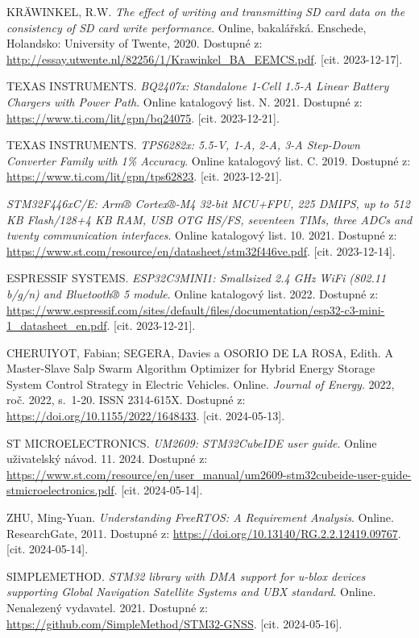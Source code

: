 \begin{thebibliography}{99}
KRÄWINKEL, R.W. \textit{The effect of writing and transmitting SD card data on the consistency of SD card write performance}. Online, bakalářská. Enschede, Holandsko: University of Twente, 2020. Dostupné z: \url{http://essay.utwente.nl/82256/1/Krawinkel\_BA\_EEMCS.pdf}. [cit. 2023-12-17].

TEXAS INSTRUMENTS. \textit{BQ2407x: Standalone 1-Cell 1.5-A Linear Battery Chargers with Power Path}. Online katalogový list. N. 2021. Dostupné z: \url{https://www.ti.com/lit/gpn/bq24075}. [cit. 2023-12-21].

TEXAS INSTRUMENTS. \textit{TPS6282x: 5.5-V, 1-A, 2-A, 3-A Step-Down Converter Family with 1\% Accuracy}. Online katalogový list. C. 2019. Dostupné z: \url{https://www.ti.com/lit/gpn/tps62823}. [cit. 2023-12-21].

\textit{STM32F446xC/E: Arm® Cortex®-M4 32-bit MCU+FPU, 225 DMIPS, up to 512 KB Flash/128+4 KB RAM, USB OTG HS/FS, seventeen TIMs, three ADCs and twenty communication interfaces}. Online katalogový list. 10. 2021. Dostupné z: \url{https://www.st.com/resource/en/datasheet/stm32f446ve.pdf}. [cit. 2023-12-14].

ESPRESSIF SYSTEMS. \textit{ESP32C3MINI1: Smallsized 2.4 GHz WiFi (802.11 b/g/n) and Bluetooth® 5 module}. Online katalogový list. 2022. Dostupné z: \url{https://www.espressif.com/sites/default/files/documentation/esp32-c3-mini-1\_datasheet\_en.pdf}. [cit. 2023-12-21].

CHERUIYOT, Fabian; SEGERA, Davies a OSORIO DE LA ROSA, Edith. A Master-Slave Salp Swarm Algorithm Optimizer for Hybrid Energy Storage System Control Strategy in Electric Vehicles. Online. \textit{Journal of Energy}. 2022, roč. 2022, s.~1-20. ISSN 2314-615X. Dostupné z: \url{https://doi.org/10.1155/2022/1648433}. [cit. 2024-05-13].

ST MICROELECTRONICS. \textit{UM2609: STM32CubeIDE user guide}. Online uživatelský návod. 11. 2024. Dostupné z: \url{https://www.st.com/resource/en/user\_manual/um2609-stm32cubeide-user-guide-stmicroelectronics.pdf}. [cit. 2024-05-14].

ZHU, Ming-Yuan. \textit{Understanding FreeRTOS: A Requirement Analysis}. Online. ResearchGate, 2011. Dostupné z: \url{https://doi.org/10.13140/RG.2.2.12419.09767}. [cit. 2024-05-14].

SIMPLEMETHOD. \textit{STM32 library with DMA support for u-blox devices supporting Global Navigation Satellite Systems and UBX standard}. Online. Nenalezený vydavatel. 2021. Dostupné z: \url{https://github.com/SimpleMethod/STM32-GNSS}. [cit. 2024-05-16].


\end{thebibliography}
